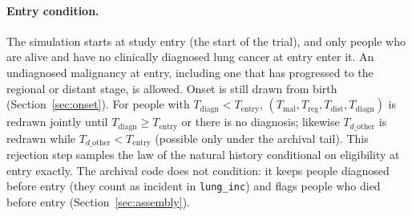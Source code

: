 \documentclass[11pt]{article}
\newcommand{\code}[1]{\texttt{#1}}
\newcommand{\Tentry}{T_{\mathrm{entry}}}
\newcommand{\Tmal}{T_{\mathrm{mal}}}
\newcommand{\Treg}{T_{\mathrm{reg}}}
\newcommand{\Tdist}{T_{\mathrm{dist}}}
\newcommand{\Tdiagn}{T_{\mathrm{diagn}}}
\newcommand{\Tdo}{T_{d\_\mathrm{other}}}
\begin{document}
\paragraph{Entry condition.} The simulation starts at study entry (the start of
the trial), and only people who are alive and have no clinically diagnosed lung
cancer at entry enter it. An undiagnosed malignancy at entry, including one that
has progressed to the regional or distant stage, is allowed. Onset is still
drawn from birth (Section~\ref{sec:onset}). For people with $\Tdiagn<\Tentry$,
$(\Tmal,\Treg,\Tdist,\Tdiagn)$ is redrawn jointly until $\Tdiagn\ge\Tentry$ or
there is no diagnosis; likewise $\Tdo$ is redrawn while $\Tdo<\Tentry$ (possible
only under the archival tail). This rejection step samples the law of the
natural history conditional on eligibility at entry exactly. The archival code
does not condition: it keeps people diagnosed before entry (they count as
incident in \code{lung\_inc}) and flags people who died before entry
(Section~\ref{sec:assembly}).
\end{document}
